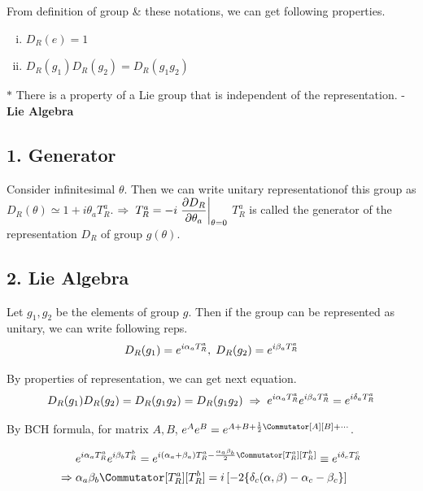 \documentclass[11pt,letterpaper]{article}
\begin{document}
From definition of group \& these notations, we can get following properties.
\begin{enumerate}[i)]
 \item $D_R(e)=1$
 \item $D_R(g_1)D_R(g_2) = D_R(g_1g_2)$
\end{enumerate}

$*$ There is a property of a Lie group that is independent of the representation. - \textbf{Lie Algebra}

\VS

\subsection*{1. Generator}

Consider infinitesimal $\theta$. Then we can write unitary representation\footnotemark of this group as
$D_R(\theta) \simeq 1 + i\theta_aT^a_R$.
$\Rightarrow\hspace{0.1cm} T^a_R= -i \left.\dfrac{\partial D_R}{\partial \theta_a}\right|_{\theta=0}$ \hs $T^a_R$ is called the generator of the representation
$D_R$ of group $g(\theta)$.


\newpage

\subsection*{2. Lie Algebra}

Let $g_1, g_2$ be the elements of group $g$. Then if the group can be represented as unitary, we can write following reps.
\begin{equation}
 D_R(g_1) = e^{i\alpha_aT^a_R},\hspace{0.1cm} D_R(g_2) = e^{i\beta_aT^a_R}
\end{equation}

By properties of representation, we can get next equation.
\VS
\begin{equation}
 D_R(g_1)D_R(g_2) = D_R(g_1g_2) = D_R(g_1g_2) \hspace{0.1cm}\Rightarrow\hspace{0.1cm} e^{i\alpha_aT^a_R}e^{i\beta_aT^a_R} = e^{i\delta_aT^a_R}
\end{equation}

By BCH formula, for matrix $A, B$, \hs $e^A e^B = e^{A+B+\frac{1}{2}\Commutator[A][B]+\cdots}$.

\begin{equation}
\label{eq:21}
 \begin{split}
  &e^{i\alpha_aT^a_R}e^{i\beta_bT^b_R}=e^{i(\alpha_a+\beta_a)T^a_R - \frac{\alpha_a\beta_b}{2}\Commutator[T^a_R][T^b_R]}
  \equiv e^{i\delta_cT^c_R} \\
  \Rightarrow \hs &\alpha_a\beta_b\Commutator[T^a_R][T^b_R] = i\left[-2\{ \delta_c(\alpha,\beta) - \alpha_c - \beta_c \}\right]
 \end{split}
\end{equation}
\end{document}
